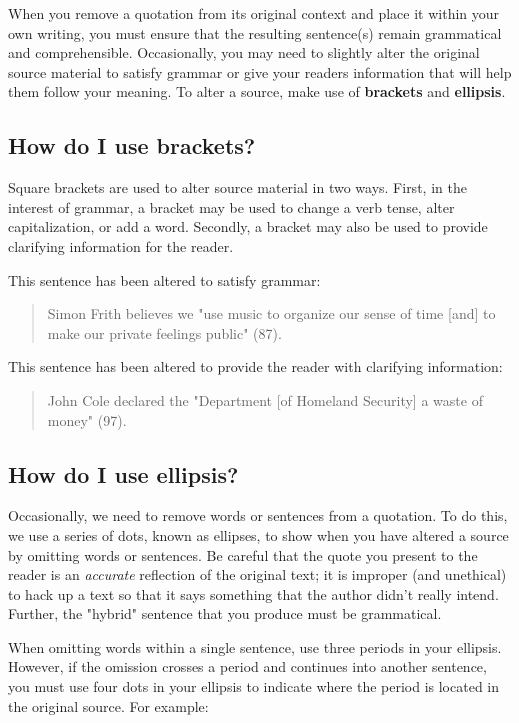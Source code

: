 When you remove a quotation from its original context and place it within your 
own writing, you must ensure that the resulting sentence(s) remain grammatical 
and comprehensible. Occasionally, you may need to slightly alter the original 
source material to satisfy grammar or give your readers information that will 
help them follow your meaning. To alter a source, make use of \textbf{brackets} 
and \textbf{ellipsis}.

\subsection{How do I use brackets?}

Square brackets are used to alter source material in two ways. First, in the interest of grammar, 
a bracket may be used to change a verb tense, alter capitalization, or add a word. Secondly, a bracket may
also be used to provide clarifying information for the reader. 

This sentence has been altered to satisfy grammar:
\begin{quote}
Simon Frith believes we "use music to organize our sense of time [and] to make 
our private feelings public" (87). 
\end{quote}

This sentence has been altered to provide the reader with clarifying information:

\begin{quote}
John Cole declared the "Department [of Homeland Security] a waste of money" (97).
\end{quote}

\subsection{How do I use ellipsis?}

Occasionally, we need to remove words or sentences from a quotation. To do this, 
we use a series of dots, known as ellipses, to show when you have altered a source 
by omitting words or sentences. Be careful that the quote you present to the 
reader is an \emph{accurate} reflection of the original text; it is improper 
(and unethical) to hack up a text so that it says something that the author 
didn't really intend. Further, the "hybrid" sentence that you produce must be grammatical.

When omitting words within a single sentence, use three periods in your ellipsis. 
However, if the omission crosses a period and continues into another sentence, 
you must use four dots in your ellipsis to indicate where the period is located 
in the original source. For example:


